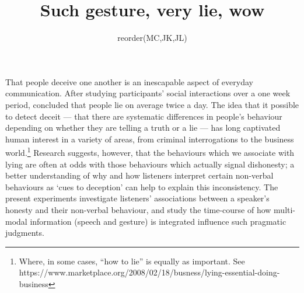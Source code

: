 \documentclass[a4paper,man,natbib]{apa6}
\title{Such gesture, very lie, wow}
\author{reorder(MC,JK,JL)}
\affiliation{Psychology, PPLS, University of Edinburgh}
\begin{document}
\maketitle

\noindent
That people deceive one another is an inescapable aspect of everyday communication.
After studying participants' social interactions over a one week period, \citet{DePaulo1996} concluded that people lie on average twice a day.
The idea that it possible to detect deceit --- that there are systematic differences in people's behaviour depending on whether they are telling a truth or a lie --- has long captivated human interest in a variety of areas, from criminal interrogations to the business world.\footnote{Where, in some cases, ``how to lie'' is equally as important. See https://www.marketplace.org/2008/02/18/busness/lying-essential-doing-business}
Research suggests, however, that the behaviours which we associate with lying are often at odds with those behaviours which actually signal dishonesty; a better understanding of why and how listeners interpret certain non-verbal behaviours as `cues to deception' can help to explain this inconsistency.
The present experiments investigate listeners' associations between a speaker's honesty and their non-verbal behaviour, and study the time-course of how multi-modal information (speech and gesture) is integrated influence such pragmatic judgments. %

\end{document}
